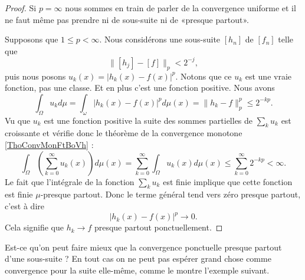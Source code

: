 \begin{proof}
    Si \( p=\infty\) nous sommes en train de parler de la convergence uniforme et il ne faut même pas prendre ni de sous-suite ni de «presque partout».

    Supposons que \( 1\leq p<\infty\). Nous considérons une sous-suite \( [h_n]\) de \( [f_n]\) telle que
    \begin{equation}
        \| [h_j]-[f] \|_p<2^{-j},
    \end{equation}
    puis nous posons \( u_k(x)=| h_k(x)-f(x) |^p\). Notons que ce \( u_k\) est une vraie fonction, pas une classe. Et en plus c'est une fonction positive. Nous avons
    \begin{equation}
        \int_{\Omega}u_kd\mu=\int_{\omega}| h_k(x)-f(x) |^pd\mu(x)=\| h_k-f \|_p^p\leq 2^{-kp}.
    \end{equation}
    Vu que \( u_k\) est une fonction positive la suite des sommes partielles de \( \sum_ku_k\) est croissante et vérifie donc le théorème de la convergence monotone \ref{ThoConvMonFtBoVh} :
    \begin{equation}
            \int_{\Omega}\left( \sum_{k=0}^{\infty}u_k(x) \right)d\mu(x)=\sum_{k=0}^{\infty}\int_{\Omega}u_k(x)d\mu(x)
            \leq\sum_{k=0}^{\infty}2^{-kp}<\infty.
    \end{equation}
    Le fait que l'intégrale de la fonction \( \sum_ku_k\) est finie implique que cette fonction est finie \( \mu\)-presque partout. Donc le terme général tend vers zéro presque partout, c'est à dire
    \begin{equation}
        | h_k(x)-f(x) |^p\to 0.
    \end{equation}
    Cela signifie que \( h_k\to f\) presque partout ponctuellement.
\end{proof}

Est-ce qu'on peut faire mieux que la convergence ponctuelle presque partout d'une sous-suite ? En tout cas on ne peut pas espérer grand chose comme convergence pour la suite elle-même, comme le montre l'exemple suivant.

